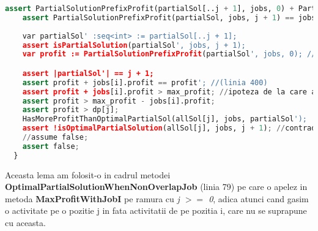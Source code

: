 \begin{lstlisting}[language=Python]
    assert PartialSolutionPrefixProfit(partialSol[..j + 1], jobs, 0) + PartialSolutionPrefixProfit(partialSol, jobs, j + 1) == PartialSolutionPrefixProfit(partialSol, jobs, 0);
    assert PartialSolutionPrefixProfit(partialSol, jobs, j + 1) == jobs[i].profit; //(2)
    
    var partialSol' :seq<int> := partialSol[..j + 1];
    assert isPartialSolution(partialSol', jobs, j + 1);
    var profit := PartialSolutionPrefixProfit(partialSol', jobs, 0); //(1)

    assert |partialSol'| == j + 1;
    assert profit + jobs[i].profit == profit'; //(linia 400)
    assert profit + jobs[i].profit > max_profit; //ipoteza de la care am plecat 
    assert profit > max_profit - jobs[i].profit;
    assert profit > dp[j];
    HasMoreProfitThanOptimalPartialSol(allSol[j], jobs, partialSol');
    assert !isOptimalPartialSolution(allSol[j], jobs, j + 1); //contradictie
    //assume false;
    assert false;
  }
\end{lstlisting}
Aceasta lema am folosit-o in cadrul metodei \textbf{OptimalPartialSolutionWhenNonOverlapJob} (linia 79) pe care o apelez in metoda \textbf{MaxProfitWithJobI}  pe ramura cu \textit{j $>=$ 0}, adica atunci cand gasim o activitate pe o pozitie j in fata activitatii de pe pozitia i, care nu se suprapune cu aceasta. 
